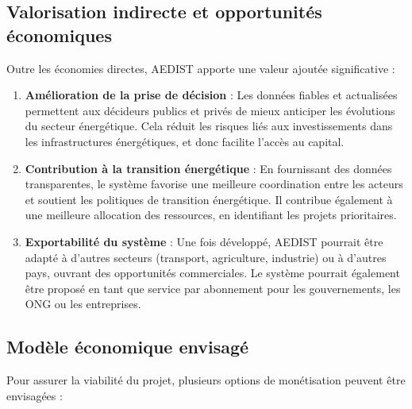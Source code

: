 \documentclass[a4paper,11pt]{report}
\providecommand{\tightlist}{\setlength{\itemsep}{0pt}\setlength{\parskip}{0pt}}
\begin{document}
\subsection{Valorisation indirecte et opportunités économiques}\label{valorisation-indirecte-et-opportunituxe9s-uxe9conomiques}

Outre les économies directes, AEDIST apporte une valeur ajoutée significative :

\begin{enumerate}
\def\labelenumi{\arabic{enumi}.}
\tightlist
\item
  \textbf{Amélioration de la prise de décision} : Les données fiables et actualisées permettent aux décideurs publics et privés de mieux anticiper les évolutions du secteur énergétique. Cela réduit les risques liés aux investissements dans les infrastructures énergétiques, et donc facilite l'accès au capital.
\item
  \textbf{Contribution à la transition énergétique} : En fournissant des données transparentes, le système favorise une meilleure coordination entre les acteurs et soutient les politiques de transition énergétique. Il contribue également à une meilleure allocation des ressources, en identifiant les projets prioritaires.
\item
  \textbf{Exportabilité du système} : Une fois développé, AEDIST pourrait être adapté à d'autres secteurs (transport, agriculture, industrie) ou à d'autres pays, ouvrant des opportunités commerciales. Le système pourrait également être proposé en tant que service par abonnement pour les gouvernements, les ONG ou les entreprises.
\end{enumerate}

\subsection{Modèle économique envisagé}\label{moduxe8le-uxe9conomique-envisaguxe9}

Pour assurer la viabilité du projet, plusieurs options de monétisation peuvent être envisagées :
\end{document}
